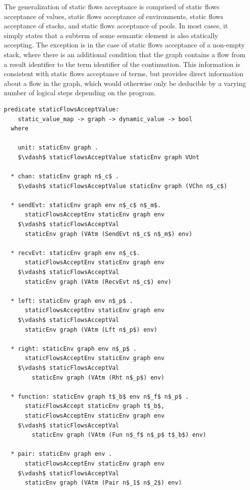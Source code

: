 \documentclass[letterpaper, 11pt]{extarticle}
\begin{document}
The generalization of static flows acceptance is comprised of static flows acceptance of values,
static flows acceptance of environments, static flows acceptance of stacks, and static
flows acceptance of pools.
In most cases, it simply states that a subterm of some semantic element is also statically
accepting. The exception is in the case of
static flows acceptance of a non-empty stack, where
there is an additional condition that the graph contains a
flow from a result identifier to the term identifier
of the continuation.
This information is consistent with static
flows acceptance of terms, but provides direct information about a flow in the
graph, which would otherwise only be deducible by a varying number of logical steps
depending on the program.

\begin{lstlisting}[language=logic, mathescape]
  predicate staticFlowsAcceptValue:
    static_value_map -> graph -> dynamic_value -> bool
  where

    unit: staticEnv graph .
    $\vdash$ staticFlowsAcceptValue staticEnv graph VUnt

  * chan: staticEnv graph n$_c$ .
    $\vdash$ staticFlowsAcceptValue staticEnv graph (VChn n$_c$)

  * sendEvt: staticEnv graph env n$_c$ n$_m$.
      staticFlowsAcceptEnv staticEnv graph env 
    $\vdash$ staticFlowsAcceptVal
      staticEnv graph (VAtm (SendEvt n$_c$ n$_m$) env)

  * recvEvt: staticEnv graph env n$_c$.
      staticFlowsAcceptEnv staticEnv graph env 
    $\vdash$ staticFlowsAcceptVal
      staticEnv graph (VAtm (RecvEvt n$_c$) env)

  * left: staticEnv graph env n$_p$ .
      staticFlowsAcceptEnv staticEnv graph env 
    $\vdash$ staticFlowsAcceptVal
      staticEnv graph (VAtm (Lft n$_p$) env)

  * right: staticEnv graph env n$_p$ .
      staticFlowsAcceptEnv staticEnv graph env
    $\vdash$ staticFlowsAcceptVal
        staticEnv graph (VAtm (Rht n$_p$) env)

  * function: staticEnv graph t$_b$ env n$_f$ n$_p$ .
      staticFlowsAccept staticEnv graph t$_b$, 
      staticFlowsAcceptEnv staticEnv graph env
    $\vdash$ staticFlowsAcceptVal
        staticEnv graph (VAtm (Fun n$_f$ n$_p$ t$_b$) env)

  * pair: staticEnv graph env . 
      staticFlowsAcceptEnv staticEnv graph env
    $\vdash$ staticFlowsAcceptVal
      staticEnv graph (VAtm (Pair n$_1$ n$_2$) env)


\end{lstlisting}
\end{document}
